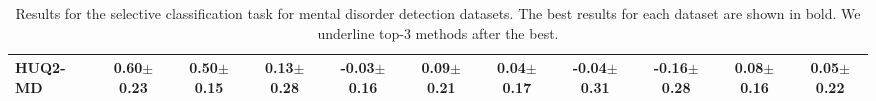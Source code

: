 \begin{table*}[!ht]
{\begin{tabular}{l|c|c|c|c|c|c|c|c|c|c}
HUQ2-MD & 0.60$\pm$0.23 & 0.50$\pm$0.15 & 0.13$\pm$0.28 & -0.03$\pm$0.16 & 0.09$\pm$0.21 & 0.04$\pm$0.17 & -0.04$\pm$0.31 & -0.16$\pm$0.28 & 0.08$\pm$0.16 & 0.05$\pm$0.22 \\
\bottomrule
\end{tabular}
}\caption{\label{tab:psy_ue_rubioroberta}Results for the selective classification task for mental disorder detection datasets. The best results for each dataset are shown in bold. We underline top-3 methods after the best.}
\end{table*}